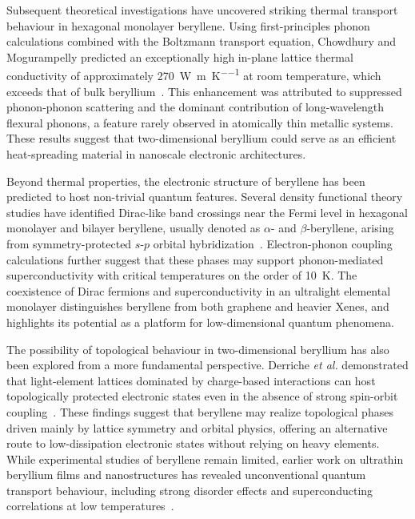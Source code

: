 Subsequent theoretical investigations have uncovered striking thermal transport behaviour in hexagonal monolayer beryllene.
Using first-principles phonon calculations combined with the Boltzmann transport equation,
Chowdhury and Mogurampelly predicted an exceptionally high in-plane lattice thermal conductivity of approximately \qty{270}{\watt\per\metre\per\kelvin} at room temperature,
which exceeds that of bulk beryllium~\cite{chowdhury2024unusual}.
This enhancement was attributed to suppressed phonon-phonon scattering and the dominant contribution of long-wavelength flexural phonons,
a feature rarely observed in atomically thin metallic systems.
These results suggest that two-dimensional beryllium could serve as an efficient heat-spreading material in nanoscale electronic architectures.

Beyond thermal properties,
the electronic structure of beryllene has been predicted to host non-trivial quantum features.
Several density functional theory studies have identified Dirac-like band crossings near the Fermi level in hexagonal monolayer and bilayer beryllene,
usually denoted as $\alpha$- and $\beta$-beryllene,
arising from symmetry-protected $s$-$p$ orbital hybridization~\cite{li2023coexistence}.
Electron-phonon coupling calculations further suggest that these phases may support phonon-mediated superconductivity with critical temperatures on the order of \qty{10}{K}.
The coexistence of Dirac fermions and superconductivity in an ultralight elemental monolayer distinguishes beryllene from both graphene and heavier Xenes,
and highlights its potential as a platform for low-dimensional quantum phenomena.

The possibility of topological behaviour in two-dimensional beryllium has also been explored from a more fundamental perspective.
Derriche \textit{et al.} demonstrated that light-element lattices dominated by charge-based interactions can host topologically protected electronic states even in the absence of strong spin-orbit coupling~\cite{derriche2024light}.
These findings suggest that beryllene may realize topological phases driven mainly by lattice symmetry and orbital physics,
offering an alternative route to low-dissipation electronic states without relying on heavy elements.
While experimental studies of beryllene remain limited,
earlier work on ultrathin beryllium films and nanostructures has revealed unconventional quantum transport behaviour,
including strong disorder effects and superconducting correlations at low temperatures~\cite{xiong2009spin}.

